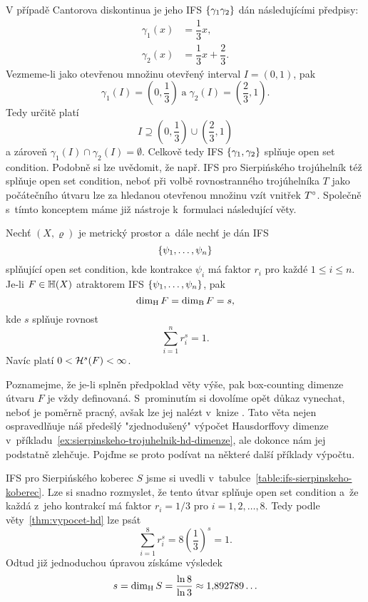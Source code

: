 V případě Cantorova diskontinua je jeho IFS $\left\{\gamma_1\gamma_2\right\}$ dán následujícími předpisy:
\begin{align*}
    \gamma_1(x)&=\dfrac{1}{3}x,\\
    \gamma_2(x)&=\dfrac{1}{3}x+\dfrac{2}{3}.
\end{align*}
Vezmeme-li jako otevřenou množinu otevřený interval $I=(0,1)$, pak
\[\gamma_1(I)=\left(0,\frac{1}{3}\right)\;\text{a}\;\gamma_2(I)=\left(\frac{2}{3},1\right).\]
Tedy určitě platí
\[I\supseteq\left(0,\frac{1}{3}\right)\cup\left(\frac{2}{3},1\right)\]
a zároveň $\gamma_1(I)\cap\gamma_2(I)=\emptyset$. Celkově tedy IFS $\left\{\gamma_1,\gamma_2\right\}$ splňuje open set condition. Podobně si lze uvědomit, že např. IFS pro Sierpińského trojúhelník též splňuje open set condition, neboť při volbě rovnostranného trojúhelníka $T$ jako počátečního útvaru lze za hledanou otevřenou množinu vzít vnitřek $T^\circ$. Společně s~tímto konceptem máme již nástroje k~formulaci následující věty.
\begin{theorem}\label{thm:vypocet-hd}
    Nechť $(X,\varrho)$ je metrický prostor a~dále nechť je dán IFS
    \[\left\{\psi_1,\ldots,\psi_n\right\}\]
    splňující open set condition, kde kontrakce $\psi_i$ má faktor $r_i$ pro každé $1\leqslant i\leqslant n$. Je-li $F\in\mathbb{H}(X)$ atraktorem IFS $\left\{\psi_1,\ldots,\psi_n\right\}$, pak
    \[\operatorname{dim_H}{F}=\operatorname{dim_B}{F}=s,\]
    kde $s$ splňuje rovnost
    \[\sum_{i=1}^{n}r_i^s=1.\]
    Navíc platí $0<\mathcal{H}^{s}(F)<\infty$. 
\end{theorem}
Poznamejme, že je-li splněn předpoklad věty výše, pak box-counting dimenze útvaru $F$ je vždy definovaná. S~prominutím si dovolíme opět důkaz vynechat, neboť je poměrně pracný, avšak lze jej nalézt v~knize \citep[str. 140]{Falconer1989}. Tato věta nejen ospravedlňuje náš předešlý "zjednodušený" výpočet Hausdorffovy dimenze v~příkladu~\ref{ex:sierpinskeho-trojuhelnik-hd-dimenze}, ale dokonce nám jej podstatně zlehčuje. Pojďme se proto podívat na některé další příklady výpočtu.
\begin{example}\label{ex:sierpinskeho-koberec-hd-dimenze}
    IFS pro Sierpińského koberec $S$ jsme si uvedli v~tabulce~\ref{table:ifs-sierpinskeho-koberec}. Lze si snadno rozmyslet, že tento útvar splňuje open set condition a~že každá z~jeho kontrakcí má faktor $r_i=1/3$ pro $i=1,2,\ldots,8$. Tedy podle věty~\ref{thm:vypocet-hd} lze psát
    \[\sum_{i=1}^{8}r_i^s=8\left(\dfrac{1}{3}\right)^s=1.\]
    Odtud již jednoduchou úpravou získáme výsledek
    \[s=\operatorname{dim_H}{S}=\dfrac{\ln{8}}{\ln{3}}\approx1{,}892789\ldots\]
\end{example}

